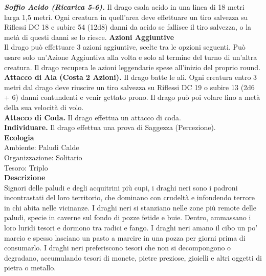 \begin{multicols}{2}
\emph{\textbf{Soffio Acido (Ricarica 5-6).}} Il drago esala acido in una linea di 18 metri larga 1,5 metri. Ogni creatura in quell'area deve effettuare un tiro salvezza su Riflessi DC 18 e subire 54 (12d8) danni da acido se fallisce il tiro salvezza, o la metà di questi danni se lo riesce. 
\textbf{Azioni Aggiuntive}\\
Il drago può effettuare 3 azioni aggiuntive, scelte tra le opzioni seguenti. Può usare solo un'Azione Aggiuntiva alla volta e solo al termine del turno di un'altra creatura. Il drago recupera le azioni leggendarie spese all'inizio del proprio round.\\
\textbf{Attacco di Ala (Costa 2 Azioni).} Il drago batte le ali. Ogni creatura entro 3 metri dal drago deve riuscire un tiro salvezza su Riflessi DC 19 o subire 13 (2d6 + 6) danni contundenti e venir gettato prono. Il drago può poi volare fino a metà della sua velocità di volo.\\
\textbf{Attacco di Coda.} Il drago effettua un attacco di coda.\\
\textbf{Individuare.} Il drago effettua una prova di Saggezza (Percezione).\\
\textbf{Ecologia}\\
Ambiente: Paludi Calde\\
Organizzazione: Solitario\\
Tesoro: Triplo\\
\textbf{Descrizione}\\
Signori delle paludi e degli acquitrini più cupi, i draghi neri sono i padroni incontrastati del loro territorio, che dominano con crudeltà e infondendo terrore in chi abita nelle vicinanze. I draghi neri si stanziano nelle zone più remote delle paludi, specie in caverne sul fondo di pozze fetide e buie. Dentro, ammassano i loro luridi tesori e dormono tra radici e fango. I draghi neri amano il cibo un po’ marcio e spesso lasciano un pasto a marcire in una pozza per giorni prima di consumarlo. I draghi neri preferiscono tesori che non si decompongono o degradano, accumulando tesori di monete, pietre preziose, gioielli e altri oggetti di pietra o metallo.\\


\end{multicols}

